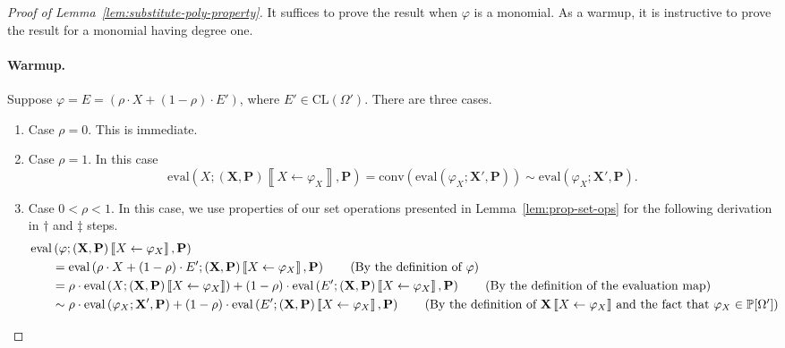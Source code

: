 \documentclass[10pt]{amsart}
\theoremstyle{plain}
\theoremstyle{definition}
\providecommand{\bP}[0]{\ensuremath{\mathbf P}\xspace}
\providecommand{\bX}[0]{\ensuremath{\mathbf X}\xspace}
\providecommand{\CL}[0]{\ensuremath{\mathrm{CL}}\xspace}
\providecommand{\conv}[1]{\ensuremath{\mathrm{conv}{\left({#1}\right)}\xspace}}
\providecommand{\evalmap}[0]{\ensuremath{\mathrm{eval}}\xspace}
\let\phi\varphi
\begin{document}
\begin{proof}[Proof of Lemma~\ref{lem:substitute-poly-property}]
It suffices to prove the result when $\varphi$ is a monomial.
As a warmup, it is instructive to prove the result for a monomial having degree one.

\paragraph{Warmup.} 
Suppose $\varphi = E= \left(\rho\cdot X + (1-\rho)\cdot E'\right)$, where $E' \in \CL(\Omega')$. 
There are three cases. 
\begin{enumerate}[1.]
\item Case $\rho = 0$. This is immediate.
\item Case $\rho = 1$. In this case 
$$ \evalmap\left(X ; (\bX,\bP)\left\llbracket X\gets \varphi_X\right\rrbracket, \bP\right) =
\conv{\evalmap(\phi_X; \bX',\bP)}
\sim \evalmap(\phi_X; \bX',\bP).
$$
\item Case $0 < \rho < 1$. In this 
case, we use properties of our set operations presented in Lemma~\ref{lem:prop-set-ops} for the following derivation in $\dagger$ and $\ddagger$ steps. 
\allowdisplaybreaks
        \begin{align*}
            \evalmap&\left(\varphi ; (\bX,\bP)\left\llbracket X\gets\varphi_X\right\rrbracket,\bP \right) \\
            &= 
            \evalmap\left(\rho\cdot X + (1-\rho)\cdot E' ; (\bX,\bP)\left\llbracket X\gets\varphi_X\right\rrbracket,\bP \right)
                    \tag{By the definition of $\varphi$}\\
            &=
            \rho\cdot \evalmap\left(X ; (\bX,\bP)\left\llbracket X\gets\varphi_X\right\rrbracket \right) 
                +(1-\rho)\cdot \evalmap\left(E'; (\bX,\bP)\left\llbracket X\gets\varphi_X\right\rrbracket,\bP \right)
                    \tag{By the definition of the evaluation map}\\
            &\sim
            \rho\cdot \evalmap\left(\varphi_X ; \bX',\bP\right) 
                +(1-\rho)\cdot \evalmap\left(E'; (\bX,\bP)\left\llbracket X\gets\varphi_X\right\rrbracket,\bP\right) 
                    \tag{By the definition of $\bX\left\llbracket X\gets\varphi_X\right\rrbracket$ and the fact that $\varphi_X \in \mathbb{P}[\Omega']$}\\ 

\end{align*}
\end{enumerate}
\end{proof}
\end{document}
